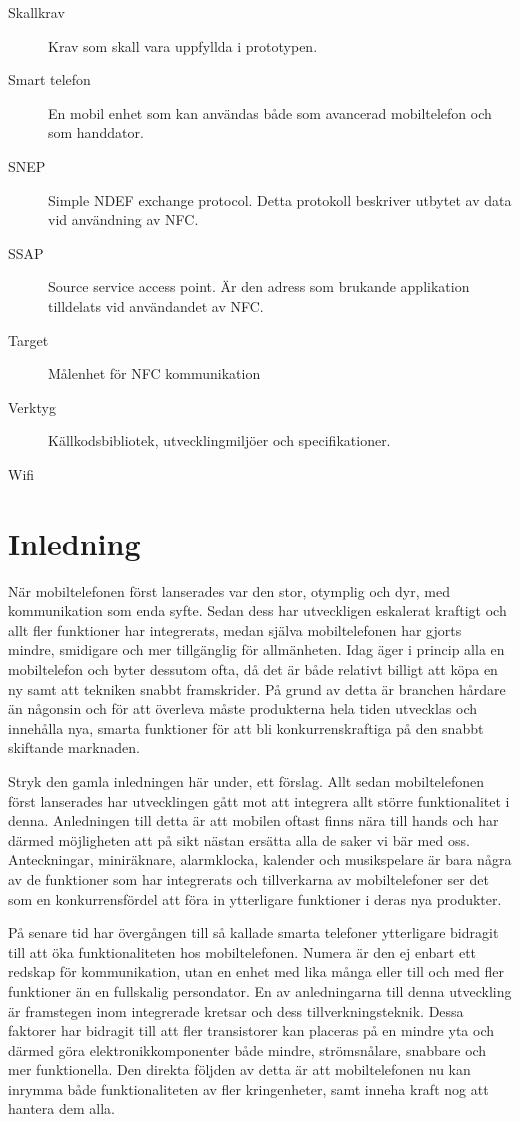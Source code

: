 \documentclass[11pt]{article}
\begin{document}
\begin{description}
\item[Skallkrav] Krav som skall vara uppfyllda i prototypen.
\item[Smart telefon] En mobil enhet som kan användas både som avancerad mobiltelefon och som handdator.
\item[SNEP] Simple NDEF exchange protocol. Detta protokoll beskriver utbytet av data vid användning av NFC.
\item[SSAP] Source service access point. Är den adress som brukande applikation tilldelats vid användandet av NFC.
\item[Target] Målenhet för NFC kommunikation
\item[Verktyg] Källkodsbibliotek, utvecklingmiljöer och specifikationer.
\item[Wifi]
\end{description}
\newpage


\setcounter{secnumdepth}{4}
\setcounter{tocdepth}{4}
\tableofcontents
\newpage



\section{Inledning}
När mobiltelefonen först lanserades var den stor, otymplig och dyr, med kommunikation som enda syfte. Sedan dess har utveckligen eskalerat kraftigt och allt fler funktioner har integrerats, medan själva mobiltelefonen har gjorts mindre, smidigare och mer tillgänglig för allmänheten. Idag äger i princip alla en mobiltelefon och byter dessutom ofta, då det är både relativt billigt att köpa en ny samt att tekniken snabbt framskrider. På grund av detta är branchen hårdare än någonsin och för att överleva måste produkterna hela tiden utvecklas och innehålla nya, smarta funktioner för att bli konkurrenskraftiga på den snabbt skiftande marknaden.

Stryk den gamla inledningen här under, ett förslag. Allt sedan mobiltelefonen först lanserades har utvecklingen gått mot att integrera allt större funktionalitet i denna. Anledningen till detta är att mobilen oftast finns nära till hands och har därmed möjligheten att på sikt nästan ersätta alla de saker vi bär med oss. Anteckningar, miniräknare, alarmklocka, kalender och musikspelare är bara några av de funktioner som har integrerats och tillverkarna av mobiltelefoner ser det som en konkurrensfördel att föra in ytterligare funktioner i deras nya produkter.

På senare tid har övergången till så kallade smarta telefoner ytterligare bidragit till att öka funktionaliteten hos mobiltelefonen. Numera är den ej enbart ett redskap för kommunikation, utan en enhet med lika många eller till och med fler funktioner än en fullskalig persondator. En av anledningarna till denna utveckling är framstegen inom integrerade kretsar och dess tillverkningsteknik. Dessa faktorer har bidragit till att fler transistorer kan placeras på en mindre yta och därmed göra elektronikkomponenter både mindre, strömsnålare, snabbare och mer funktionella. Den direkta följden av detta är att mobiltelefonen nu kan inrymma både funktionaliteten av fler kringenheter, samt inneha kraft nog att hantera dem alla.
\end{document}
